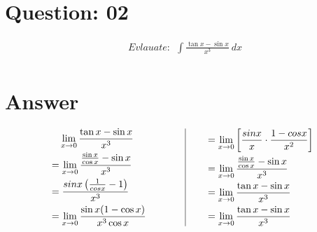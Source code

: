 \documentclass[17pt]{extarticle}
\begin{document}
\begin{fleqn}
\section{Question: 02}

\begin{equation} \nonumber
\begin{alignedat}{4}
& Evlauate :\ \  \int \frac{\tan{x} - \sin{x}}{x^3}\ dx\\
\end{alignedat}
\end{equation}



\section{Answer}

\begin{equation} \nonumber
\begin{alignedat}{4}
& \texttt{\ \ } \lim_{x \to 0} \frac{\tan{x} - \sin{x}}{x^3}\\
&= \lim_{x \to 0} \frac{\frac{\sin{x}}{\cos{x}}-\sin{x}}{x^3}\\
&= \frac{sin x\left(\frac{1}{cos x} - 1\right)}{x^3}\\
&= \lim_{x \to 0} \frac{\sin{x}(1  - \cos{x})}{x^3\cos{x}}\\
\end{alignedat}
\qquad
\qquad
\vrule
\qquad
\begin{alignedat}{4}
&= \lim_{x \to 0}\left[\frac{sin x}{x}\cdot\frac{1 - cos x}{x^2} \right] \\
&= \lim_{x \to 0} \frac{\frac{\sin{x}}{\cos{x}}-\sin{x}}{x^3}\\
&= \lim_{x \to 0} \frac{\tan{x} - \sin{x}}{x^3}\\
&= \lim_{x \to 0} \frac{\tan{x} - \sin{x}}{x^3}\\
\end{alignedat}
\end{equation}



\end{fleqn}
\end{document}
